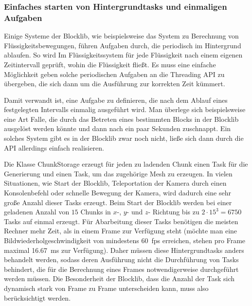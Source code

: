 \subsubsection{Einfaches starten von Hintergrundtasks und einmaligen Aufgaben}\label{sec:reqBackgroundTasks}
Einige Systeme der Blocklib, wie beispielsweise das System zu Berechnung von Flüssigkeitsbewegungen, führen Aufgaben durch, die periodisch im Hintergrund ablaufen. So wird Im Flüssigkeitssystem für jede Flüssigkeit nach einem eigenen Zeitintervall geprüft, wohin die Flüssigkeit fließt. Es muss eine einfache Möglichkeit geben solche periodischen Aufgaben an die Threading API zu übergeben, die sich dann um die Ausführung zur korrekten Zeit kümmert.

Damit verwandt ist, eine Aufgabe zu definieren, die nach dem Ablauf eines festgelegten Intervalls einmalig ausgeführt wird. Man überlege sich beispielsweise eine Art Falle, die durch das Betreten eines bestimmten Blocks in der Blocklib ausgelöst werden könnte und dann nach ein paar Sekunden zuschnappt. Ein solches System gibt es in der Blocklib zwar noch nicht, ließe sich dann durch die API allerdings einfach realisieren.

Die Klasse ChunkStorage erzeugt für jeden zu ladenden Chunk einen Task für die Generierung und einen Task, um das zugehörige Mesh zu erzeugen. In vielen Situationen, wie  Start der Blocklib, Teleportation der Kamera durch einen Konsolenbefehl oder schnelle Bewegung der Kamera, wird dadurch eine sehr große Anzahl dieser Tasks erzeugt. Beim Start der Blocklib werden bei einer geladenen Anzahl von $15$ Chunks in  $x$-, $y$- und $z$- Richtung bis zu $2\cdot15^3=6750$  Tasks auf einmal erzeugt. Für Abarbeitung dieser Tasks benötigen die meisten Rechner mehr Zeit, als in einem Frame zur Verfügung steht (möchte man eine Bildwiederholgeschwindigkeit von mindestens 60~\ac{fps} erreichen, stehen pro Frame maximal \SI{16,67}{\milli\second} zur Verfügung). Daher müssen diese Hintergrundtasks anders behandelt werden, sodass deren Ausführung nicht die Durchführung von Tasks behindert, die für die Berechnung eines Frames notwendigerweise durchgeführt werden müssen. Die Besonderheit der Blocklib, dass die Anzahl der Task sich dynamisch stark von Frame zu Frame unterscheiden kann, muss also berücksichtigt werden.